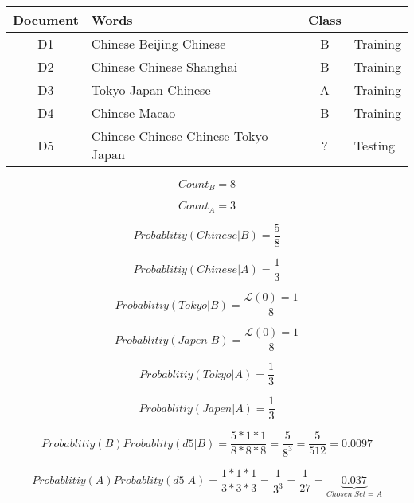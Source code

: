 \begin{tabular}{||c l c l|}
\hline
Document&	Words	& 	Class	&	\\
\hline
\hline
D1	&	Chinese Beijing Chinese	& 	B	&	Training \\
D2	&	Chinese Chinese	Shanghai& 	B	&	Training \\
D3	&	Tokyo Japan Chinese	& 	A	&	Training \\
D4	&	Chinese Macao		& 	B	&	Training \\
	D5	&	Chinese Chinese Chinese Tokyo Japan 	& 	? & Testing		\\
\hline
\end{tabular}
\linebreak
\begin{center}
\begin{equation*}
	Count_B = 8
\end{equation*}

\begin{equation*}
	Count_A = 3
\end{equation*}

\begin{equation*}
	Probablitiy(Chinese|B) = \frac{5}{8} 
\end{equation*}

\begin{equation*}
	Probablitiy(Chinese|A) = \frac{1}{3} 
\end{equation*}

\begin{equation*}
	Probablitiy(Tokyo|B) = \frac{\mathcal{L}(0)=1}{8} 
\end{equation*}

\begin{equation*}
	Probablitiy(Japen|B) = \frac{\mathcal{L}(0)=1}{8} 
\end{equation*}

\begin{equation*}
	Probablitiy(Tokyo|A) = \frac{1}{3} 
\end{equation*}

\begin{equation*}
	Probablitiy(Japen|A) = \frac{1}{3} 
\end{equation*}

\begin{equation*}
	Probablitiy(B)Probablity(d5|B) = \frac{5*1*1}{8*8*8} = \frac{5}{8^3}= \frac{5}{512}=0.0097
\end{equation*}

\begin{equation*}
	Probablitiy(A)Probablity(d5|A) = \frac{1*1*1}{3*3*3} = \frac{1}{3^3} = \frac{1}{27}=\underbrace{0.037}_{Chosen \; Set=A} 
\end{equation*}
\end{center}
